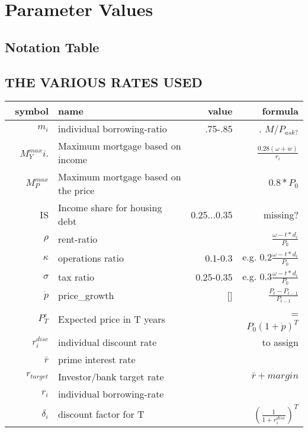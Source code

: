 \chapter[Parameters]{Parameter Values}
\label{AppendixA}
  
    
    
    
 

\section{Notation Table}



\section{THE VARIOUS RATES USED}


\renewcommand{\arraystretch}{1.5}
\begin{tabular}{rlrr}\
symbol  & name              & value&formula  \\ \hline
$m_i$       & individual borrowing-ratio   & .75-.85 &. $M/P_{ask?}$  \\
$M^{max}_Yi$. &Maximum mortgage based on income && $\frac{0.28(\omega+w)}{r_i}$\\
 $M^{max}_P$ & Maximum mortgage based on the price & & $0.8*P_0$\\
IS&Income share for housing debt&0.25...0.35& missing?\\
$\rho   $&rent-ratio        & & $\frac{\omega-t*d_i}{P_0}$\\
$\kappa $&operations ratio  &0.1-0.3& e.g. $ 0.2\frac{\omega-t*d_i}{P_0}$\\
$\sigma$      &tax ratio      & 0.25-0.35 &e.g. $ 0.3\frac{\omega-t*d_i}{P_0}$\\
$\dot p $ &price\_growth &[] & $\frac{P_t-P_{t-1}}{P_{t-1}}$\\
$P^e_T$ & Expected price in T years&&=$P_0(1+\dot p)^T$\\
$r^{disc}_i$&individual discount rate& &to assign \\
$\bar r$     &prime interest rate       &&\\
$r_{target}$ & Investor/bank target rate && $\bar r + margin$\\
$r_i$   & individual borrowing-rate  &&\\
$\delta_i$ & discount factor for T& &$\left(\frac{1}{1+r^{disc}_i}\right)^T$ \\
\end{tabular}
\renewcommand{\arraystretch}{1.0}



